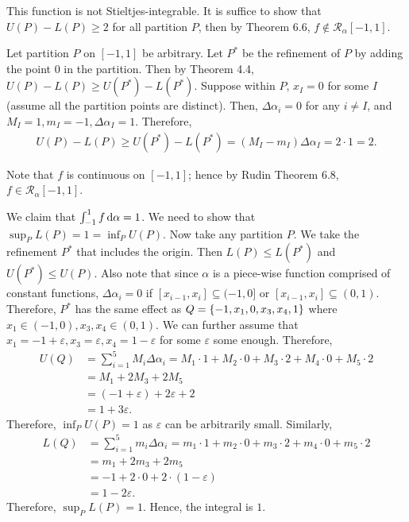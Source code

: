 \documentclass[12pt]{article}
\begin{document}
\begin{fproof}[4(b)]
\end{fproof}

\begin{fproof}[4(c)]
  This function is not Stieltjes-integrable.
  It is suffice to show that \(U(P) - L(P) \geq 2\) for all partition \(P\), then by Theorem 6.6, \(f \notin \mathcal{R}_{\alpha}[-1,1]\).
  
  Let partition \(P\) on \([-1,1]\) be arbitrary. Let \(P^*\) be the refinement of \(P\) by adding the point \(0\) in the partition.
  Then by Theorem 4.4, \(U(P) - L(P) \geq U(P^*) - L(P^*)\).
  Suppose within \(P\), \(x_{I} = 0\) for some \(I\) (assume all the partition points are distinct).
  Then, \(\Delta \alpha_i = 0\) for any \(i \neq I\), and \(M_I = 1, m_I = -1, \Delta \alpha_I = 1\).
  Therefore,
  \begin{align*}
    U(P) - L(P) \geq U(P^*) - L(P^*) = (M_I - m_I) \Delta \alpha_I = 2 \cdot 1 = 2.
  \end{align*}
\end{fproof}

\begin{fproof}[4(d)]
   Note that \(f\) is continuous on \([-1,1]\); hence by Rudin Theorem 6.8, \(f \in \mathcal{R}_{\alpha}[-1,1]\).

   We claim that \(\int_{-1}^{1} f \mathop{}\!\mathrm{d}\alpha = 1\).
   We need to show that \(\sup_P L(P) = 1 = \inf_P U(P)\).
   Now take any partition \(P\).
   We take the refinement \(P^*\) that includes the origin. Then \(L(P) \leq L(P^*)\) and \(U(P^*) \leq U(P)\).
   Also note that since \(\alpha\) is a piece-wise function comprised of constant functions, \(\Delta \alpha_i = 0\) if \([x_{i-1}, x_i] \subseteq (-1, 0]\) or \([x_{i-1}, x_i] \subseteq (0,1)\).
   Therefore, \(P^*\) has the same effect as \(Q = \left\{ -1, x_1, 0, x_3, x_4, 1 \right\}\) where \(x_1 \in (-1,0), x_3,x_4 \in (0,1)\).
   We can further assume that \(x_1 = -1 + \varepsilon, x_3 = \varepsilon, x_4 = 1-\varepsilon\) for some \(\varepsilon\) some enough.
   Therefore,
   \begin{align*}
    U(Q) & = \sum_{i=1}^{5}M_i \Delta \alpha_i = M_1 \cdot 1 + M_2 \cdot 0 + M_3 \cdot 2 + M_4 \cdot 0 +  M_5 \cdot 2\\
    & = M_1 + 2M_3 + 2M_5\\
    & = (-1 + \varepsilon) + 2\varepsilon + 2\\
    & = 1 + 3 \varepsilon.
   \end{align*}
   Therefore, \(\inf_P U(P)= 1\) as \(\varepsilon\) can be arbitrarily small.
   Similarly,
   \begin{align*}
    L(Q) & = \sum_{i=1}^{5}m_i \Delta \alpha_i = m_1 \cdot 1 + m_2 \cdot 0 + m_3 \cdot 2 + m_4 \cdot 0 +  m_5 \cdot 2\\
    &= m_1 + 2m_3 + 2m_5\\
    &= -1 + 2 \cdot 0 + 2 \cdot (1- \varepsilon)\\
    & = 1-2 \varepsilon.
   \end{align*}
   Therefore, \(\sup_P L(P) = 1\).
   Hence, the integral is \(1\).
\end{fproof}
\newpage

\begin{fproof}[5]

\end{fproof}
\end{document}
